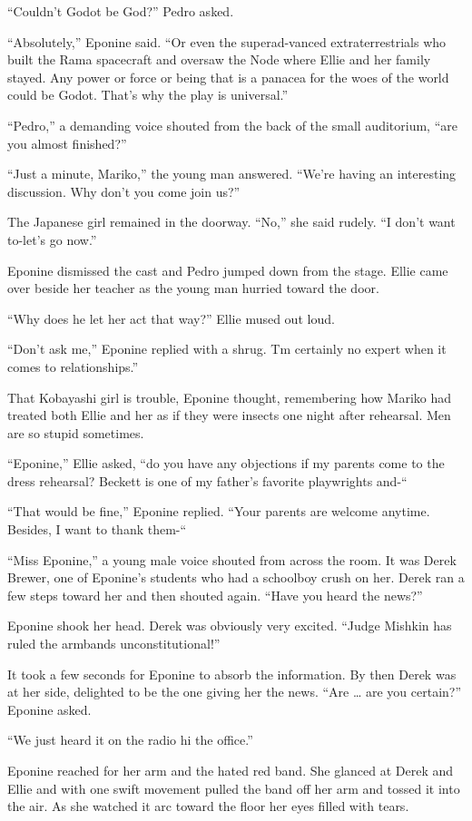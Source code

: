 \documentclass[]{article}
\begin{document}
{“Couldn’t Godot be God?” Pedro asked.

“Absolutely,” Eponine said. “Or even the superad-vanced extraterrestrials who built the Rama spacecraft and oversaw the Node where Ellie and her family stayed. Any power or force or being that is a panacea for the woes of the world could be Godot. That’s why the play is universal.”

“Pedro,” a demanding voice shouted from the back of the small auditorium, “are you almost finished?”

“Just a minute, Mariko,” the young man answered. “We’re having an interesting discussion. Why don’t you come join us?”

The Japanese girl remained in the doorway. “No,” she said rudely. “I don’t want to-let’s go now.”

Eponine dismissed the cast and Pedro jumped down from the stage. Ellie came over beside her teacher as the young man hurried toward the door.

“Why does he let her act that way?” Ellie mused out loud.

“Don’t ask me,” Eponine replied with a shrug. Tm certainly no expert when it comes to relationships.”

That Kobayashi girl is trouble, Eponine thought, remembering how Mariko had treated both Ellie and her as if they were insects one night after rehearsal. Men are so stupid sometimes.

“Eponine,” Ellie asked, “do you have any objections if my parents come to the dress rehearsal? Beckett is one of my father’s favorite playwrights and-“

“That would be fine,” Eponine replied. “Your parents are welcome anytime. Besides, I want to thank them-“

“Miss Eponine,” a young male voice shouted from across the room. It was Derek Brewer, one of Eponine’s students who had a schoolboy crush on her. Derek ran a few steps toward her and then shouted again. “Have you heard the news?”

Eponine shook her head. Derek was obviously very excited. “Judge Mishkin has ruled the armbands unconstitutional!”

It took a few seconds for Eponine to absorb the information. By then Derek was at her side, delighted to be the one giving her the news. “Are … are you certain?” Eponine asked.

“We just heard it on the radio hi the office.”

Eponine reached for her arm and the hated red band. She glanced at Derek and Ellie and with one swift movement pulled the band off her arm and tossed it into the air. As she watched it arc toward the floor her eyes filled with tears.

}
\end{document}
